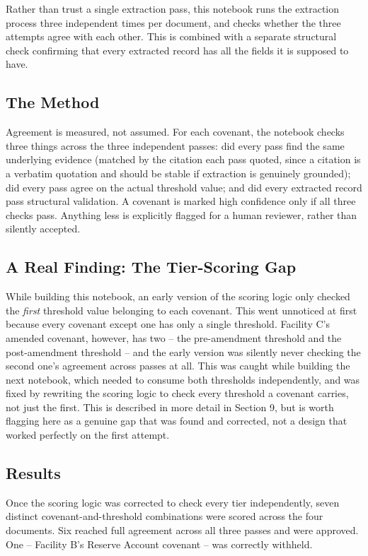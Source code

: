 \documentclass[11pt,a4paper]{article}
\begin{document}
Rather than trust a single extraction pass, this notebook runs the extraction process three independent times per document, and checks whether the three attempts agree with each other. This is combined with a separate structural check confirming that every extracted record has all the fields it is supposed to have.

\subsection{The Method}

Agreement is measured, not assumed. For each covenant, the notebook checks three things across the three independent passes: did every pass find the same underlying evidence (matched by the citation each pass quoted, since a citation is a verbatim quotation and should be stable if extraction is genuinely grounded); did every pass agree on the actual threshold value; and did every extracted record pass structural validation. A covenant is marked high confidence only if all three checks pass. Anything less is explicitly flagged for a human reviewer, rather than silently accepted.

\subsection{A Real Finding: The Tier-Scoring Gap}

While building this notebook, an early version of the scoring logic only checked the \emph{first} threshold value belonging to each covenant. This went unnoticed at first because every covenant except one has only a single threshold. Facility C's amended covenant, however, has two -- the pre-amendment threshold and the post-amendment threshold -- and the early version was silently never checking the second one's agreement across passes at all. This was caught while building the next notebook, which needed to consume both thresholds independently, and was fixed by rewriting the scoring logic to check every threshold a covenant carries, not just the first. This is described in more detail in Section 9, but is worth flagging here as a genuine gap that was found and corrected, not a design that worked perfectly on the first attempt.

\subsection{Results}

Once the scoring logic was corrected to check every tier independently, seven distinct covenant-and-threshold combinations were scored across the four documents. Six reached full agreement across all three passes and were approved. One -- Facility B's Reserve Account covenant -- was correctly withheld.
\end{document}
